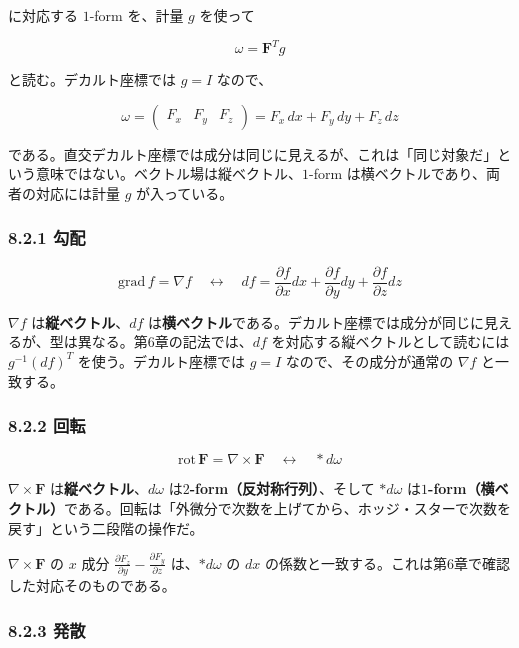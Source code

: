 \documentclass[a4paper,12pt,openany]{book}
\begin{document}
に対応する \(1\)-form を、計量 \(g\) を使って

\[
\omega=\mathbf{F}^T g
\]

と読む。デカルト座標では \(g=I\) なので、

\[
\omega
=
\begin{pmatrix}
F_x & F_y & F_z
\end{pmatrix}
=
F_x\,dx+F_y\,dy+F_z\,dz
\]

である。直交デカルト座標では成分は同じに見えるが、これは「同じ対象だ」という意味ではない。ベクトル場は縦ベクトル、\(1\)-form
は横ベクトルであり、両者の対応には計量 \(g\) が入っている。

\hypertarget{ux52feux914d-1}{%
\subsubsection{8.2.1 勾配}\label{ux52feux914d-1}}

\[
\mathrm{grad}\,f = \nabla f
\quad\longleftrightarrow\quad
df = \frac{\partial f}{\partial x}dx + \frac{\partial f}{\partial y}dy + \frac{\partial f}{\partial z}dz
\]

\(\nabla f\) は\textbf{縦ベクトル}、\(df\)
は\textbf{横ベクトル}である。デカルト座標では成分が同じに見えるが、型は異なる。第6章の記法では、\(df\)
を対応する縦ベクトルとして読むには \(g^{-1}(df)^T\)
を使う。デカルト座標では \(g=I\) なので、その成分が通常の \(\nabla f\)
と一致する。

\hypertarget{ux56deux8ee2-1}{%
\subsubsection{8.2.2 回転}\label{ux56deux8ee2-1}}

\[
\mathrm{rot}\,\mathbf{F} = \nabla \times \mathbf{F}
\quad\longleftrightarrow\quad
\ast d\omega
\]

\(\nabla\times\mathbf{F}\) は\textbf{縦ベクトル}、\(d\omega\)
は\textbf{$2$-form（反対称行列）}、そして \(\ast d\omega\)
は\textbf{$1$-form（横ベクトル）}である。回転は「外微分で次数を上げてから、ホッジ・スターで次数を戻す」という二段階の操作だ。

\(\nabla\times\mathbf{F}\) の \(x\) 成分
\(\frac{\partial F_z}{\partial y} - \frac{\partial F_y}{\partial z}\)
は、\(\ast d\omega\) の \(dx\)
の係数と一致する。これは第6章で確認した対応そのものである。

\hypertarget{ux767aux6563-1}{%
\subsubsection{8.2.3 発散}\label{ux767aux6563-1}}
\end{document}
